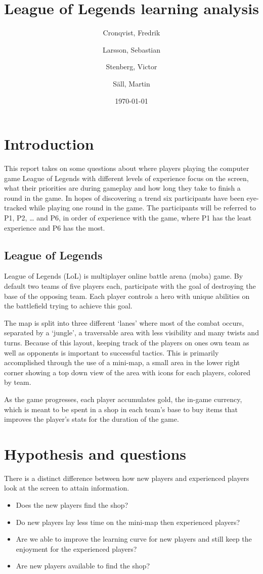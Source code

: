 \documentclass{article}
\author{Cronqvist, Fredrik \and Larsson, Sebastian \and Stenberg, Victor \and S\"{a}ll, Martin}
\date{\today}
\title{League of Legends learning analysis}
\begin{document}
\maketitle

\section{Introduction}
This report takes on some questions about where players playing the computer game League of Legends with different levels of experience focus on the screen, what their priorities are during gameplay and how long they take to finish a round in the game. In hopes of discovering a trend six participants have been eye-tracked while playing one round in the game. The participants will be referred to P1, P2, … and P6, in order of experience with the game, where P1 has the least experience and P6 has the most.

\subsection{League of Legends}
League of Legends (LoL) is multiplayer online battle arena (moba) game. By default two teams of five players each, participate with the goal of destroying the base of the opposing team. Each player controls a hero with unique abilities on the battlefield trying to achieve this goal.

The map is split into three different `lanes' where most of the combat occurs, separated by a `jungle', a traversable area with less visibility and many twists and turns. Because of this layout, keeping track of the players on ones own team as well as opponents is important to successful tactics. This is primarily accomplished through the use of a mini-map, a small area in the lower right corner showing a top down view of the area with icons for each players, colored by team.

As the game progresses, each player accumulates gold, the in-game currency, which is meant to be spent in a shop in each team's base to buy items that improves the player's stats for the duration of the game.

\section{Hypothesis and questions}
There is a distinct difference between how new players and experienced players look at the screen to attain information.

\begin{itemize}
\item Does the new players find the shop?
\item Do new players lay less time on the mini-map then experienced players?
\item Are we able to improve the learning curve for new players and still keep the enjoyment for the experienced players?
\item Are new players available to find the shop?
\end{itemize}
\end{document}
